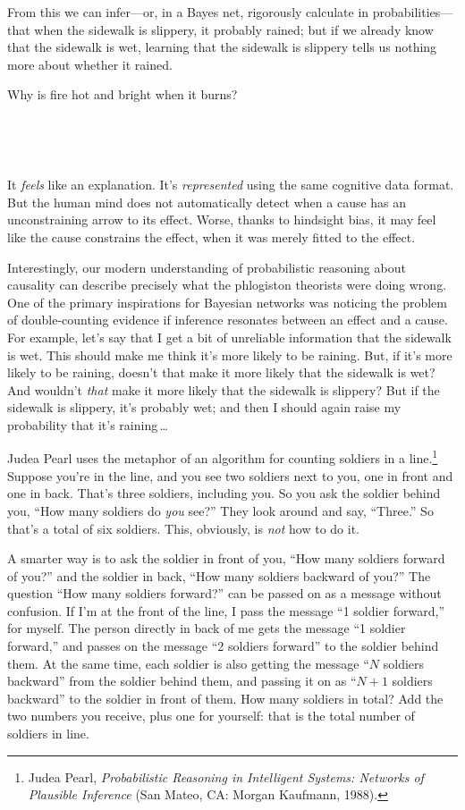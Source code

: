 {
 From this we can infer---or, in a Bayes net, rigorously calculate
in probabilities---that when the sidewalk is slippery, it probably
rained; but if we already know that the sidewalk is wet, learning that
the sidewalk is slippery tells us nothing more about whether it
rained.}

{
 Why is fire hot and bright when it burns?}

{
 ~}


{
 ~}

{
 It \textit{feels} like an explanation. It's
\textit{represented} using the same cognitive data format. But the
human mind does not automatically detect when a cause has an
unconstraining arrow to its effect. Worse, thanks to hindsight bias, it
may feel like the cause constrains the effect, when it was merely
fitted to the effect.}

{
 Interestingly, our modern understanding of probabilistic reasoning
about causality can describe precisely what the phlogiston theorists
were doing wrong. One of the primary inspirations for Bayesian networks
was noticing the problem of double-counting evidence if inference
resonates between an effect and a cause. For example,
let's say that I get a bit of unreliable information
that the sidewalk is wet. This should make me think
it's more likely to be raining. But, if
it's more likely to be raining, doesn't
that make it more likely that the sidewalk is wet? And
wouldn't \textit{that} make it more likely that the
sidewalk is slippery? But if the sidewalk is slippery,
it's probably wet; and then I should again raise my
probability that it's raining\,\ldots}

{
 Judea Pearl uses the metaphor of an algorithm for counting
soldiers in a line.\footnote{Judea Pearl, \textit{Probabilistic Reasoning in Intelligent
Systems: Networks of Plausible Inference} (San Mateo, CA: Morgan
Kaufmann, 1988).} Suppose you're
in the line, and you see two soldiers next to you, one in front and one
in back. That's three soldiers, including you. So you
ask the soldier behind you, ``How many soldiers do
\textit{you} see?'' They look around and say,
``Three.'' So that's
a total of six soldiers. This, obviously, is \textit{not} how to do
it.}

{
 A smarter way is to ask the soldier in front of you,
``How many soldiers forward of
you?'' and the soldier in back,
``How many soldiers backward of
you?'' The question ``How many
soldiers forward?'' can be passed on as a message
without confusion. If I'm at the front of the line, I
pass the message ``1 soldier
forward,'' for myself. The person directly in back of
me gets the message ``1 soldier
forward,'' and passes on the message
``2 soldiers forward'' to the
soldier behind them. At the same time, each soldier is also getting the
message ``$N$ soldiers backward'' from
the soldier behind them, and passing it on as ``$N + 1$
soldiers backward'' to the soldier in front of them.
How many soldiers in total? Add the two numbers you receive, plus one
for yourself: that is the total number of soldiers in line.}

